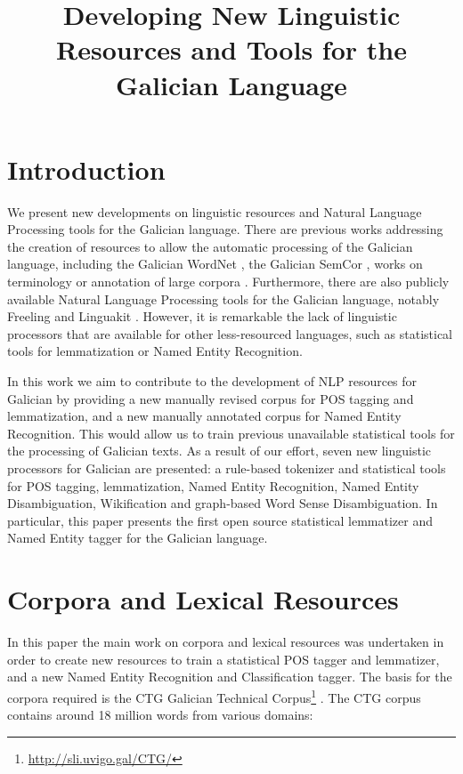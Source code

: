 \documentclass[10pt, a4paper]{article}
\title{Developing New Linguistic Resources and Tools for the Galician Language\vspace*{.5\baselineskip} }
\begin{document}
\maketitleabstract

\section{Introduction}\label{sec:introduction}

We present new developments on linguistic resources and Natural Language Processing tools for the Galician language. There are previous works addressing the creation of resources to allow the automatic processing of the Galician language, including the Galician WordNet \cite{galnet}, the Galician SemCor \cite{sensogal}, works on terminology \cite{termonet} or annotation of large corpora \cite{LM09}. Furthermore, there are also publicly available Natural Language Processing tools for the Galician language, notably Freeling \cite{freeling3_padro12} and Linguakit \cite{gamallo2017linguakit}. However, it is remarkable the lack of linguistic processors that are available for other less-resourced languages, such as statistical tools for lemmatization or Named Entity Recognition.

In this work we aim to contribute to the development of NLP resources for Galician by providing a new manually revised corpus for POS tagging and lemmatization, and a new manually annotated corpus for Named Entity Recognition. This would allow us to train previous unavailable statistical tools for the processing of Galician texts. As a result of our effort, seven new linguistic processors for Galician are presented: a rule-based tokenizer and statistical tools for POS tagging, lemmatization, Named Entity Recognition, Named Entity Disambiguation, Wikification and graph-based Word Sense Disambiguation. In particular, this paper presents the first open source statistical lemmatizer and Named Entity tagger for the Galician language.

\section{Corpora and Lexical Resources}\label{sec:corpora-dictionaries}

In this paper the main work on corpora and lexical resources was undertaken in order to create new resources to train a statistical POS tagger and lemmatizer, and a new Named Entity Recognition and Classification tagger. The basis for the corpora required is the CTG Galician Technical Corpus\footnote{\url{http://sli.uvigo.gal/CTG/}} . The CTG corpus contains around 18 million words from various domains:
\end{document}
